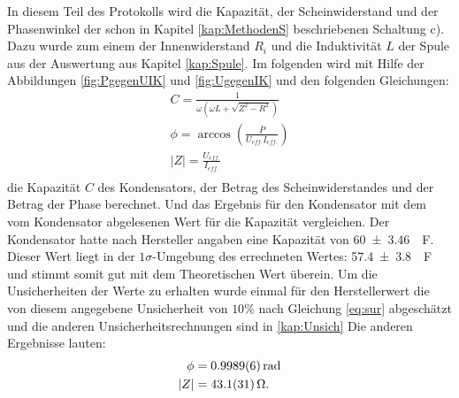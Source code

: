 In diesem Teil des Protokolls wird die Kapazität, der Scheinwiderstand und der Phasenwinkel der schon in Kapitel \ref{kap:MethodenS} beschriebenen Schaltung c). 
Dazu wurde zum einem der Innenwiderstand $R_i$ und die Induktivität $L$ der Spule aus der Auswertung aus Kapitel \ref{kap:Spule}.
Im folgenden wird mit Hilfe der Abbildungen \ref{fig:PgegenUIK} und \ref{fig:UgegenIK}
und den folgenden Gleichungen:
\begin{align}
C=\frac{1}{\omega (\omega L+\sqrt{Z^2-R^2})}\\	
\phi = \arccos\left(\frac{\bar{P}}{U_{eff.}I_{eff.}}\right)\\
	|Z|=\frac{U_{eff.}}{I_{eff.}}\\	
\end{align}
die Kapazität $C$ des Kondensators, der Betrag des Scheinwiderstandes und der Betrag der Phase berechnet. Und das Ergebnis für den Kondensator mit dem vom Kondensator abgelesenen Wert für die Kapazität vergleichen.
Der Kondensator hatte nach Hersteller angaben eine Kapazität von \SI{60+-3.46}{\mu F}.
Dieser Wert liegt in der $1\sigma$-Umgebung des errechneten Wertes: \SI{57.4+-3.8}{\mu F} und stimmt somit gut mit dem Theoretischen Wert überein.
Um die Unsicherheiten der Werte zu erhalten wurde einmal für den Herstellerwert die von diesem angegebene Unsicherheit von $10\%$ nach Gleichung
\ref{eq:sur} abgeschätzt und die anderen Unsicherheitsrechnungen sind in \ref{kap:Unsich}
Die anderen Ergebnisse lauten:
\begin{align}
		\phi &=\SI{0.9989+-0.0006}{rad}\\
		|Z| &=\SI{43.1+-3.1}{\ohm}.
\end{align}
